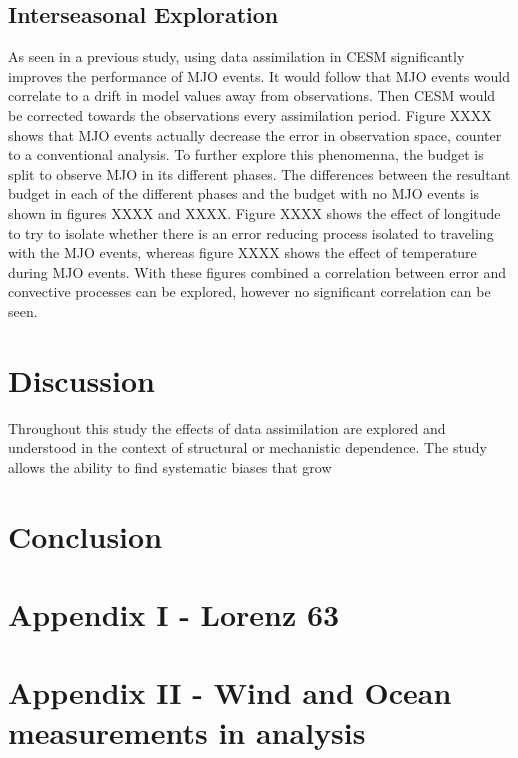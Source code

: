 \documentclass[smallextended]{svjour3}       %
\begin{document}
\subsection{Interseasonal Exploration}
As seen in a previous study, using data assimilation in CESM significantly improves the performance of MJO events. It would follow that MJO events would correlate to a drift in model values away from observations. Then CESM would be corrected towards the observations every assimilation period. Figure XXXX shows that MJO events actually decrease the error in observation space, counter to a conventional analysis. To further explore this phenomenna, the budget is split to observe MJO in its different phases. The differences between the resultant budget in each of the different phases and the budget with no MJO events is shown in figures XXXX and XXXX. Figure XXXX shows the effect of longitude to try to isolate whether there is an error reducing process isolated to traveling with the MJO events, whereas figure XXXX shows the effect of temperature during MJO events. With these figures combined a correlation between error and convective processes can be explored, however no significant correlation can be seen.

\section{Discussion}
Throughout this study the effects of data assimilation are explored and understood in the context of structural or mechanistic dependence. The study allows the ability to find systematic biases that grow
\section{Conclusion}

\section{Appendix I - Lorenz 63}

\section{Appendix II - Wind and Ocean measurements in analysis}
\end{document}

